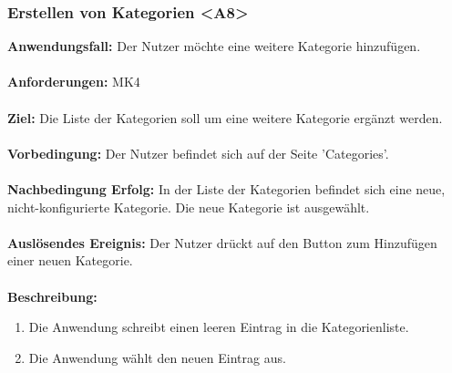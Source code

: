 \documentclass[parskip=full]{scrartcl} %
\begin{document}
\subsubsection*{Erstellen von Kategorien <A8>}
\textbf{Anwendungsfall:} Der Nutzer möchte eine weitere Kategorie hinzufügen.\\\\
\textbf{Anforderungen:} MK4\\\\
\textbf{Ziel:} Die Liste der Kategorien soll um eine weitere Kategorie ergänzt werden. \\\\
\textbf{Vorbedingung:} Der Nutzer befindet sich auf der Seite 'Categories'. \\\\
\textbf{Nachbedingung Erfolg:} In der Liste der Kategorien befindet sich eine neue, nicht-konfigurierte Kategorie. Die neue Kategorie ist ausgewählt.\\\\
\textbf{Auslösendes Ereignis:} Der Nutzer drückt auf den Button zum Hinzufügen einer neuen Kategorie. \\\\
\textbf{Beschreibung:}
\begin{enumerate}
    \item Die Anwendung schreibt einen leeren Eintrag in die Kategorienliste.
    \item Die Anwendung wählt den neuen Eintrag aus.
\end{enumerate}
\newpage
\end{document}
